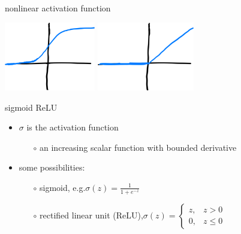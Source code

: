 \documentclass[xcolor={svgnames},
               hyperref={colorlinks,citecolor=DeepPink4,linkcolor=FireBrick,urlcolor=Maroon}]
               {beamer}
\begin{document}
\begin{frame}{nonlinear activation function}

\begin{center}
\includegraphics[height=30mm]{figs/sigmoid} \hspace{10mm} \includegraphics[height=30mm]{figs/relu}

sigmoid \hspace{42mm} ReLU \phantom{fo}
\end{center}

\begin{itemize}
\item $\sigma$ is the \alert{activation function}
    \begin{itemize}
    \item[$\circ$] an increasing scalar function with bounded derivative
    \end{itemize}
\item some possibilities:
    \begin{itemize}
    \item[$\circ$] \alert{sigmoid}, e.g.\qquad $\displaystyle \sigma(z) = \frac{1}{1 + e^{-z}}$
    \item[$\circ$] \alert{rectified linear unit (ReLU)},\qquad $\displaystyle \sigma(z) = \begin{cases} z, & z > 0 \\ 0, & z \le 0 \end{cases}$
    \end{itemize}
\end{itemize}
\end{frame}
\end{document}
